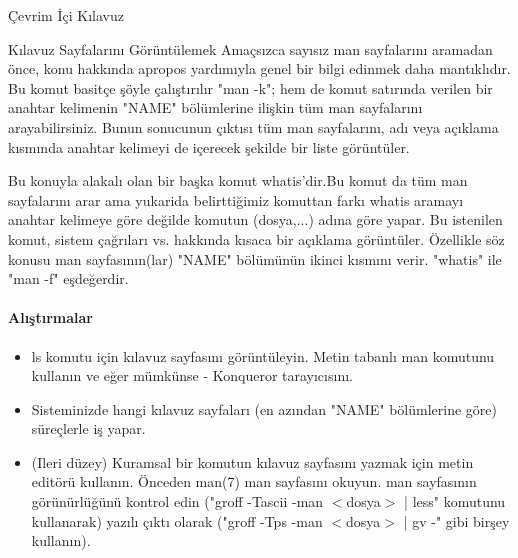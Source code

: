 \begin{section}{Çevrim İçi Kılavuz}
\begin{subsection}{Kılavuz Sayfalarını Görüntülemek}
Amaçsızca sayısız man sayfalarını aramadan önce, konu hakkında apropos yardımıyla genel bir bilgi edinmek daha mantıklıdır. Bu komut basitçe şöyle çalıştırılır "man -k"; hem de komut satırında verilen bir anahtar kelimenin "NAME" bölümlerine ilişkin tüm man sayfalarını arayabilirsiniz. Bunun sonucunun çıktısı tüm man sayfalarını, adı veya açıklama kısmında anahtar kelimeyi de içerecek şekilde bir liste görüntüler.

Bu konuyla alakalı olan bir başka komut whatis'dir.Bu komut da tüm man sayfalarını arar ama yukarida belirttiğimiz komuttan farkı whatis aramayı anahtar kelimeye göre değilde komutun (dosya,...) adına göre yapar. Bu istenilen komut, sistem çağrıları vs. hakkında kısaca bir açıklama görüntüler. Özellikle söz konusu man sayfasının(lar) "NAME" bölümünün ikinci  kısmını verir. "whatis" ile "man -f" eşdeğerdir.
\paragraph{Alıştırmalar}{
\begin{itemize}
 \item ls komutu için kılavuz sayfasını görüntüleyin. Metin tabanlı man komutunu kullanın ve eğer mümkünse - Konqueror tarayıcısını.
 \item Sisteminizde hangi kılavuz sayfaları (en azından "NAME" bölümlerine göre) süreçlerle iş yapar.
 \item (Ileri düzey) Kuramsal bir komutun kılavuz sayfasını yazmak için metin editörü kullanın. Önceden man(7) man sayfasını okuyun. man sayfasının görünürlüğünü kontrol edin ("groff -Tascii -man $<$dosya$>$ | less" komutunu kullanarak) yazılı çıktı olarak ("groff -Tps -man $<$dosya$>$ | gv -" gibi birşey kullanın).
\end{itemize}}
\end{subsection}
\end{section}
